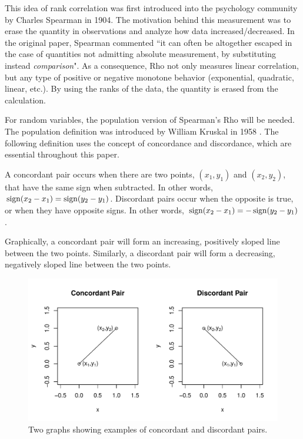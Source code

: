 This idea of rank correlation was first introduced into the psychology community by Charles Spearman in 1904. The motivation behind this measurement was to erase the quantity in observations and analyze how data increased/decreased. In the original paper, Spearman commented ``it can often be altogether escaped in the case of quantities not admitting absolute measurement, by substituting instead \textit{comparison}"\cite{spearman1904}. As a consequence, Rho not only measures linear correlation, but any type of positive or negative monotone behavior (exponential, quadratic, linear, etc.). By using the ranks of the data, the quantity is erased from the calculation.

For random variables, the population version of Spearman's Rho will be needed. The population definition was introduced by William Kruskal in 1958 \cite{kruskal1958}. The following definition uses the concept of concordance and discordance, which are essential throughout this paper.
\begin{definition}\label{def:concordant_discordant}
    A concordant pair occurs when there are two points, $(x_1,y_1)$ and $(x_2,y_2)$, that have the same sign when subtracted. In other words, $\operatorname{sign}(x_2-x_1)=\operatorname{sign}(y_2-y_1)$. Discordant pairs occur when the opposite is true, or when they have opposite signs. In other words, $\operatorname{sign}(x_2-x_1)=-\operatorname{sign}(y_2-y_1)$.
\end{definition}
Graphically, a concordant pair will form an increasing, positively sloped line between the two points. Similarly, a discordant pair will form a decreasing, negatively sloped line between the two points.
\begin{figure}[h]
    \centering
    \includegraphics[scale=0.85]{images/pairs.pdf}
    \caption{Two graphs showing examples of concordant and discordant pairs.}
    \label{fig:pairs}
\end{figure}
